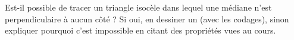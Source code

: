 
\begin{exercice}\label{exo2smath-0080}

Est-il possible de tracer un triangle isocèle dans lequel une médiane n'est perpendiculaire à aucun côté ? Si oui, en dessiner un (avec les codages), sinon expliquer pourquoi c'est impossible en citant des propriétés vues au cours.

\end{exercice}
